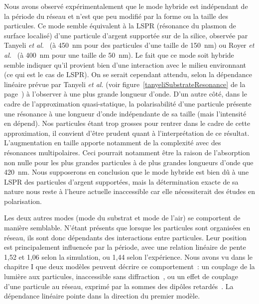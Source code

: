 Nous avons observé expérimentalement que le mode hybride est indépendant de la période du réseau et n'est que peu modifié par la forme ou la taille des particules. Ce mode semble équivalent à la LSPR (résonance du plasmon de surface localisé) d'une particule d'argent supportée sur de la silice, observée par Tanyeli \textit{et al.}~\cite{tanyeli2013effect} (à 450~nm pour des particules d'une taille de 150~nm) ou Royer \textit{et al.}~\cite{royer1987substrate} (à 400~nm pour une taille de 50~nm). Le fait que ce mode soit hybride semble indiquer qu'il provient bien d'une interaction avec le milieu environnant (ce qui est le cas de LSPR). On se serait cependant attendu, selon la dépendance linéaire prévue par Tanyeli \textit{et al.} (voir figure~\ref{tanyeliSubstrateResonance} de la page~\pageref{tanyeliSubstrateResonance}) à l'observer à une plus grande longueur d'onde. D'un autre côté, dans le cadre de l'approximation quasi-statique, la polarisabilité d'une particule présente une résonance à une longueur d'onde indépendante de sa taille (mais l'intensité en dépend). Nos particules étant trop grosses pour rentrer dans le cadre de cette approximation, il convient d'être prudent quant à l'interprétation de ce résultat. L'augmentation en taille apporte notamment de la complexité avec des résonances multipolaires. Ceci pourrait notamment être la raison de l'absorption non nulle pour les plus grandes particules à de plus grandes longueurs d'onde que 420~nm. Nous supposerons en conclusion que le mode hybride est bien dû à une LSPR des particules d'argent supportées, mais la détermination exacte de sa nature nous reste à l'heure actuelle inaccessible car elle nécessiterait des études en polarisation.\par 
Les deux autres modes (mode du substrat et mode de l'air) se comportent de manière semblable. N'étant présents que lorsque les particules sont organisées en réseau, ils sont donc dépendants des interactions entre particules. Leur position est principalement influencée par la période, avec une relation linéaire de pente 1,52 et 1,06 selon la simulation, ou 1,44 selon l'expérience. 
Nous avons vu dans le chapitre I que deux modèles peuvent décrire ce comportement~: un couplage de la lumière aux particules, inaccessible sans diffraction~\cite{kravets2008extremely}, ou un effet de couplage d'une particule au réseau, exprimé par la sommes des dipôles retardés~\cite{zou2004narrow}. La dépendance linéaire pointe dans la direction du premier modèle.\par 
